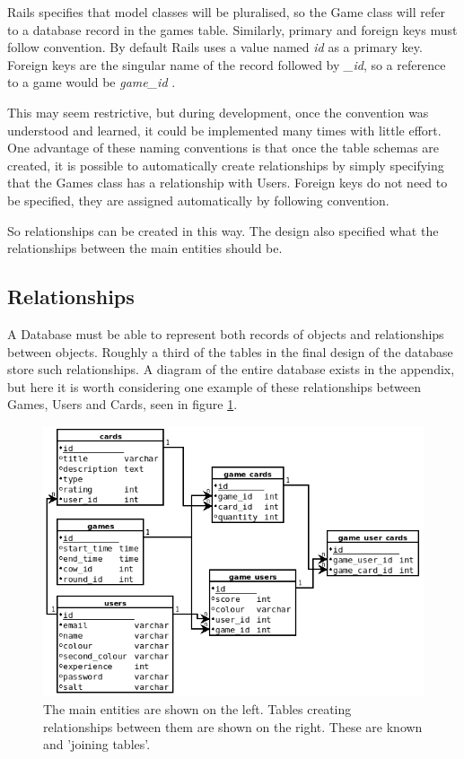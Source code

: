 Rails specifies that model classes will be pluralised, so the Game class will refer to a database record in the games table. Similarly, primary and foreign keys must follow convention. By default Rails uses a value named \textit{id} as a primary key. Foreign keys are the singular name of the record followed by \textit{\_id}, so a reference to a game would be \textit{game\_id} \cite{RailsActRec}.

This may seem restrictive, but during development, once the convention was understood and learned, it could be implemented many times with little effort. One advantage of these naming conventions is that once the table schemas are created, it is possible to automatically create relationships by simply specifying that the Games class has a relationship with Users. Foreign keys do not need to be specified, they are assigned automatically by following convention.

So relationships can be created in this way. The design also specified what the relationships between the main entities should be.

\subsection{Relationships}
A Database must be able to represent both records of objects and relationships between objects. Roughly a third of the tables in the final design of the database store such relationships. A diagram of the entire database exists in the appendix, but here it is worth considering one example of these relationships between Games, Users and Cards, seen in figure \ref{2_relationships}.

\begin{figure}[ht]
\centering
\includegraphics[width=6in]{Images/2/relationship_example}
\caption{The main entities are shown on the left. Tables creating relationships between them are shown on the right. These are known and 'joining tables'.}
\label{2_relationships}
\end{figure}

